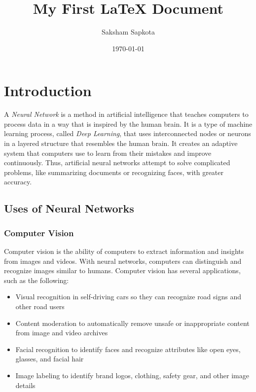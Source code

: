 \documentclass[titlepage, 12pt]{article}
\title{My First LaTeX Document}
\author{Saksham Sapkota}
\date{\today}
\begin{document}
	\maketitle
	\tableofcontents 
	\pagebreak
	\section{Introduction} 
	A \emph{Neural Network} is a method in artificial intelligence that teaches computers to process data in a way that is inspired by the human brain. It is a type of machine learning process, called \emph{Deep Learning}, that uses interconnected nodes or neurons in a layered structure that resembles the human brain. It creates an adaptive system that computers use to learn from their mistakes and improve continuously. Thus, artificial neural networks attempt to solve complicated problems, like summarizing documents or recognizing faces, with greater accuracy.
		\subsection {Uses of Neural Networks}
			\subsubsection{Computer Vision}
			Computer vision is the ability of computers to extract information and insights from images and videos. With neural networks, computers can distinguish and recognize images similar to humans. Computer vision has several applications, such as the following:
			\begin{itemize}
				\item Visual recognition in self-driving cars so they can recognize road signs and other road users
				\item Content moderation to automatically remove unsafe or inappropriate content from image and video archives
				\item Facial recognition to identify faces and recognize attributes like open eyes, glasses, and facial hair
				\item Image labeling to identify brand logos, clothing, safety gear, and other image details
			\end{itemize}
			
\end{document}
